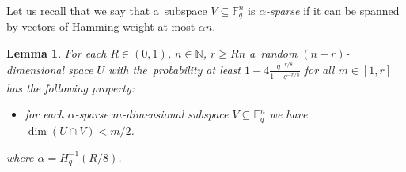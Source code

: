 \documentclass[11pt]{article}
\let\le\leqslant
\let\ge\geqslant
\theoremstyle{plain}
\newtheorem{lemma}{Lemma}
\theoremstyle{definition}
\theoremstyle{remark}
\newcommand{\NN}{\mathbb{N}}
\newcommand{\F}{\mathbb{F}}
\DeclareMathOperator{\rk}{rk}
\begin{document}
Let us recall that we say that a~subspace $V\subseteq \F_q^n$ is \emph{$\alpha$-sparse} if it can be spanned by vectors of Hamming weight at most $\alpha n$.

\begin{lemma}\label{lemma:subspace-int}
    For each $R\in (0,1)$, $n\in \NN$, $r\ge R n$ %
    a~random $(n-r)$-dimensional space $U$ with the~probability at least $1-4\frac{q^{-r/8}}{1-q^{-r/8}}$ for all $m\in [1, r]$ has the following property:
    \begin{itemize}
    \item[$(*)$] for each $\alpha$-sparse $m$-dimensional subspace $V\subseteq \F_q^n$ we have $\dim (U\cap V) < m/2$. %
    \end{itemize}
    where $\alpha=H_q^{-1}(R/8)$.
\end{lemma}
\end{document}
